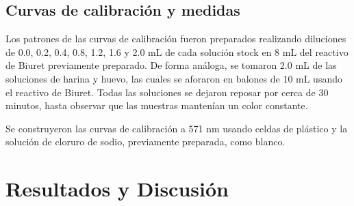 \documentclass[fleqn,10pt]{SelfArx}
\begin{document}
	\subsection{Curvas de calibraci\'on y medidas}
		Los patrones de las curvas de calibraci\'on fueron preparados realizando diluciones de 0.0, 0.2, 0.4, 0.8, 1.2, 1.6 y 2.0 mL de cada soluci\'on stock en 8 mL del reactivo de Biuret previamente preparado. De forma an\'aloga, se tomaron 2.0 mL de las soluciones de harina y huevo, las cuales se aforaron en balones de 10 mL usando el reactivo de Biuret. Todas las soluciones se dejaron reposar por cerca de 30 minutos, hasta observar que las muestras manten\'ian un color constante.
		
		Se construyeron las curvas de calibraci\'on a 571 nm usando celdas de pl\'astico y la soluci\'on de cloruro de sodio, previamente preparada, como blanco.
	
\section{Resultados y Discusi\'on}
\end{document}
